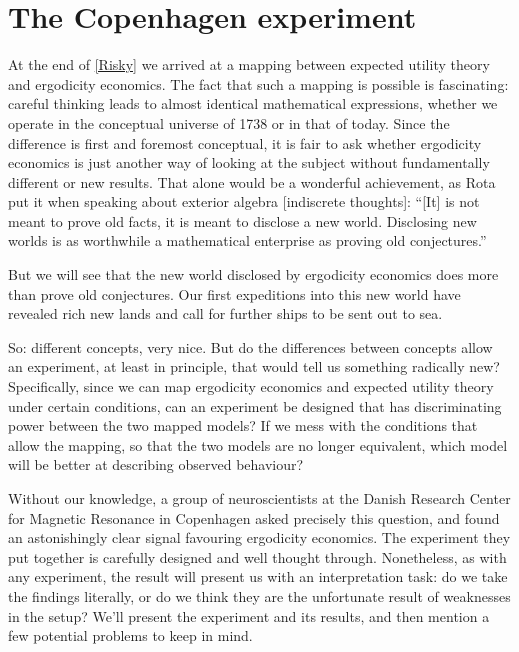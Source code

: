 \section{The Copenhagen experiment}
At the end of \cref{Risky} we arrived at a mapping between expected utility 
theory and ergodicity economics. The fact that such a mapping is possible is fascinating: careful 
thinking leads to almost identical mathematical expressions, whether we operate in the conceptual
universe of 1738 or in that of today. Since the difference is first and foremost conceptual, 
it is fair to ask whether ergodicity economics is just another way of looking at the subject
without fundamentally different or new results. That alone would be a wonderful achievement,
as Rota put it when speaking about exterior algebra \cite[p.48]{Rota1997} [indiscrete thoughts]: 
``[It] is not meant to prove old facts, it is meant to disclose a new world. Disclosing new 
worlds is as worthwhile a mathematical enterprise as proving old conjectures.''

But we will see that the new world disclosed by ergodicity economics does more than 
prove old conjectures. Our first expeditions into this new world have revealed rich 
new lands and call for further ships to be sent out to sea.

So: different concepts, very nice. But do the differences between concepts allow an experiment, 
at least in principle, that would tell us something radically new? Specifically, since we can 
map ergodicity economics and expected utility theory under certain conditions, can an experiment
be designed that has discriminating power between the two mapped models? If we mess with the
conditions that allow the mapping, so that the two models are no longer equivalent, which model
will be better at describing observed behaviour?

Without our knowledge, a group of neuroscientists at the Danish Research Center for Magnetic 
Resonance in Copenhagen asked precisely this question, and found an astonishingly clear
signal favouring ergodicity economics. The experiment they put together is
carefully designed and well thought through. Nonetheless, as with any experiment, the result will 
present us with an interpretation task: do we take the findings literally, or do we think they are 
the unfortunate result of weaknesses in the setup? We'll present the experiment and its results, 
and then mention a few potential problems to keep in mind.

